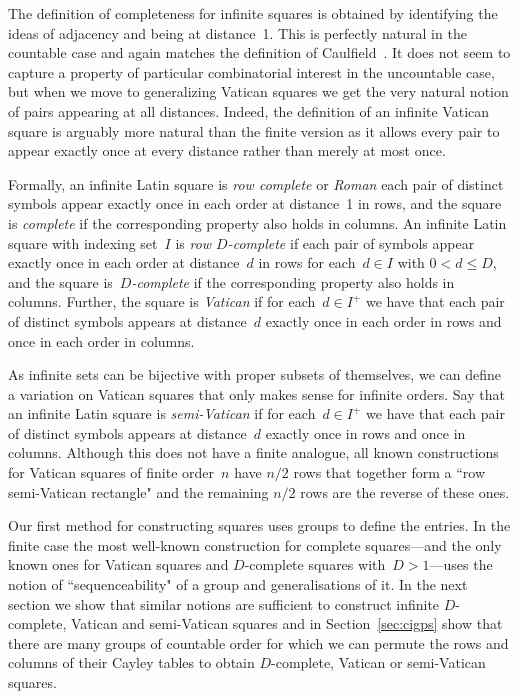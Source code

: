 \documentclass[12pt,a4paper]{article}
\begin{document}
The definition of completeness for infinite squares is obtained by identifying the ideas of adjacency and being at distance~1.  This is perfectly natural in the countable case and again matches the definition of Caulfield~\cite{Caulfield96}.   It does not seem to capture a property of particular combinatorial interest in the uncountable case, but when we move to generalizing Vatican squares we get the very natural notion of pairs appearing at  all distances.  Indeed, the definition of an infinite Vatican square is arguably more natural than the finite version as it allows every pair to appear exactly once  at every distance rather than merely at most once.

Formally, an infinite Latin square is {\em row complete} or {\em Roman} each pair of distinct symbols appear exactly once in each order at distance~1 in rows, and the square is {\em complete} if the corresponding property also holds in columns.   An infinite Latin square with indexing set~$I$ is {\em row $D$-complete} if each pair of symbols appear exactly once in each order at distance~$d$ in rows for each~$d \in I$ with $0 < d \leq D$, and the square is~{\em $D$-complete} if the corresponding property also holds in columns. Further, the square is {\em Vatican} if for each~$d \in I^+$ we have that each pair of distinct symbols appears at distance~$d$ exactly once in each order in rows and once in each order in columns.

As infinite sets can be bijective with proper subsets of themselves, we can define a variation on Vatican squares that only makes sense for infinite orders.
Say that an infinite Latin square is {\em semi-Vatican} if for each~$d \in I^+$ we have that each pair of distinct symbols appears at distance~$d$ exactly once in rows and once in columns.  Although this does not have a finite analogue, all known constructions for Vatican squares of finite order~$n$ have $n/2$ rows that together form a ``row semi-Vatican rectangle" and the remaining $n/2$ rows are the reverse of these ones.

Our first method for constructing squares uses groups to define the entries.   In the finite case the most well-known construction for complete squares---and the only known ones for Vatican squares and $D$-complete squares with~$D>1$---uses the notion of ``sequenceability" of a group and generalisations of it.  In the next section we show that similar notions are sufficient to construct infinite $D$-complete, Vatican and semi-Vatican squares and in Section~\ref{sec:cigps} show that there are many groups of countable order for which we can permute the rows and columns of their Cayley tables to obtain $D$-complete, Vatican or semi-Vatican squares.
\end{document}
